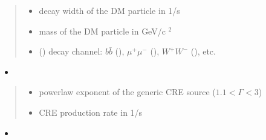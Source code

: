 \documentclass[letterpaper,10pt,english]{sphinxmanual}
\begin{document}
\begin{fulllineitems}
\begin{itemize}
\end{itemize}
\begin{quote}\begin{description}
\begin{itemize}
\item {} 
\sphinxAtStartPar
{} \textendash{} decay width of the DM particle in 1/s

\item {} 
\sphinxAtStartPar
{} \textendash{} mass of the DM particle in GeV/c \({}^2\)

\item {} 
\sphinxAtStartPar
{} () \textendash{} decay channel: \(b\bar b\) (), \(\mu^+ \mu^-\) (), \(W^+ W^-\) (), etc.

\end{itemize}

\end{description}\end{quote}
\begin{itemize}
\item {} 
\sphinxAtStartPar
{}

\end{itemize}
\begin{quote}\begin{description}
\begin{itemize}
\item {} 
\sphinxAtStartPar
{} \textendash{} power\sphinxhyphen{}law exponent of the generic CRE source (\(1.1 < \Gamma < 3\))

\item {} 
\sphinxAtStartPar
{} \textendash{} CRE production rate in 1/s

\end{itemize}

\end{description}\end{quote}
\begin{itemize}
\item {} 
\sphinxAtStartPar
{}


\end{itemize}
\end{fulllineitems}
\end{document}
